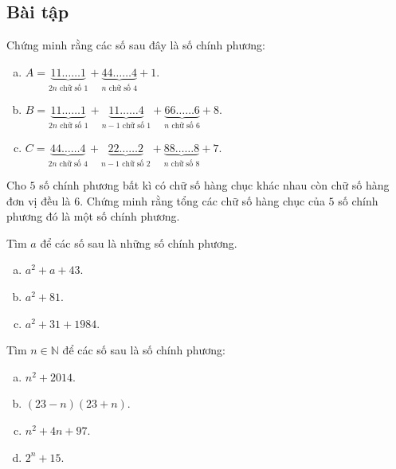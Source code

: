 \subsection{Bài tập}
\setcounter {bt}{0}
\begin{bt}%
	Chứng minh rằng các số sau đây là số chính phương:
	\begin{enumerate} [a)]
		\item $A=\underbrace{11\ldots\ldots1}_{2n\text{ chữ số } 1}+\underbrace{44\ldots\ldots4}_{n\text{ chữ số } 4}+1$.
		\item $B=\underbrace{11\ldots\ldots1}_{2n\text{ chữ số } 1}+\underbrace{11\ldots\ldots4}_{n-1\text{ chữ số } 1}+\underbrace{66\ldots\ldots6}_{n\text{ chữ số } 6}+8$.
		\item $C=\underbrace{44\ldots\ldots4}_{2n\text{ chữ số } 4}+\underbrace{22\ldots\ldots2}_{n-1\text{ chữ số } 2}+\underbrace{88\ldots\ldots8}_{n\text{ chữ số } 8}+7$.
	\end{enumerate}
\end{bt}
\begin{bt}%
	Cho $5$ số chính phương bất kì có chữ số hàng chục khác nhau còn chữ số hàng đơn vị đều là $6$. Chứng minh rằng tổng các chữ số hàng chục của $5$ số chính phương đó là một số chính phương.
\end{bt}
\begin{bt}%
	Tìm $a$ để các số sau là những số chính phương.
	\begin{multicols}{3}
		\begin{enumerate}[a)]
			\item $a^2+a+43$.
			\item $a^2+81$.
			\item $a^2+31+1984$.
		\end{enumerate}
	\end{multicols}	
\end{bt}
\begin{bt}%
	Tìm $n\in \mathbb{N}$ để các số sau là số chính phương:
	\begin{multicols}{2}
		\begin{enumerate}[a)]
			\item $n^2+2014$.
			\item $(23-n)(23+n)$.
			\item $n^2+4n+97$.
			\item $2^n+15$.
		\end{enumerate}
	\end{multicols}
\end{bt}
